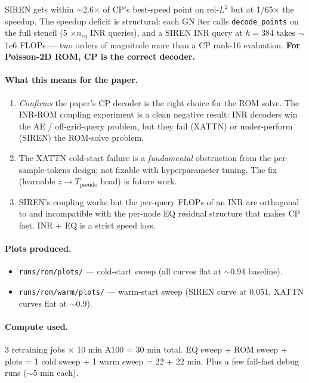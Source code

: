 \documentclass[11pt]{article}
\begin{document}
SIREN gets within $\sim$2.6$\times$ of CP's best-speed point on
rel-$L^2$ but at 1/65$\times$ the speedup. The speedup deficit is
structural: each GN iter calls \texttt{decode\_points} on the full
stencil (5 $\times n_{eq}$ INR queries), and a SIREN INR query at
$h=384$ takes $\sim$1e6 FLOPs --- two orders of magnitude more than a
CP rank-16 evaluation. \textbf{For Poisson-2D ROM, CP is the correct
decoder.}

\paragraph{What this means for the paper.}
\begin{enumerate}
\item \emph{Confirms} the paper's CP decoder is the right choice for
      the ROM solve. The INR-ROM coupling experiment is a clean
      negative result: INR decoders win the AE / off-grid-query
      problem, but they fail (XATTN) or under-perform (SIREN) the
      ROM-solve problem.
\item The XATTN cold-start failure is a \emph{fundamental} obstruction
      from the per-sample-tokens design; not fixable with hyperparameter
      tuning. The fix (learnable $z \to T_{\text{pseudo}}$ head) is
      future work.
\item SIREN's coupling works but the per-query FLOPs of an INR are
      orthogonal to and incompatible with the per-node EQ residual
      structure that makes CP fast. INR + EQ is a strict speed loss.
\end{enumerate}

\paragraph{Plots produced.}
\begin{itemize}
\item \texttt{runs/rom/plots/} --- cold-start sweep (all curves flat at
      $\sim$0.94 baseline).
\item \texttt{runs/rom/warm/plots/} --- warm-start sweep (SIREN curve
      at 0.051, XATTN curves flat at $\sim$0.9).
\end{itemize}

\paragraph{Compute used.}
3 retraining jobs $\times$ 10 min A100 = 30 min total. EQ sweep + ROM
sweep + plots = 1 cold sweep + 1 warm sweep = 22 + 22 min. Plus a few
fail-fast debug runs ($\sim$5 min each).
\end{document}
